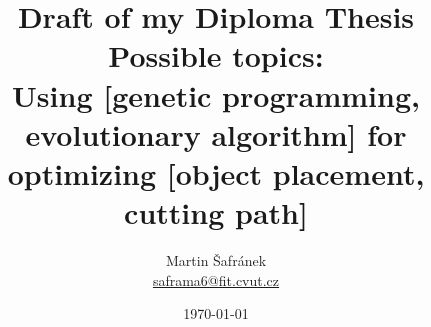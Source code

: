 \documentclass{article}
\begin{document}
    \title{Draft of my Diploma Thesis\\
            Possible topics:\\
            Using [genetic programming, evolutionary algorithm] for optimizing [object placement, cutting path]}
    \author{Martin Šafránek \\  \href{mailto:saframa6@fit.cvut.cz}{saframa6@fit.cvut.cz}}
    \date{\today}
    \maketitle
    \tableofcontents
    \newpage

    

    \printbibliography
    \appendix
\end{document}
